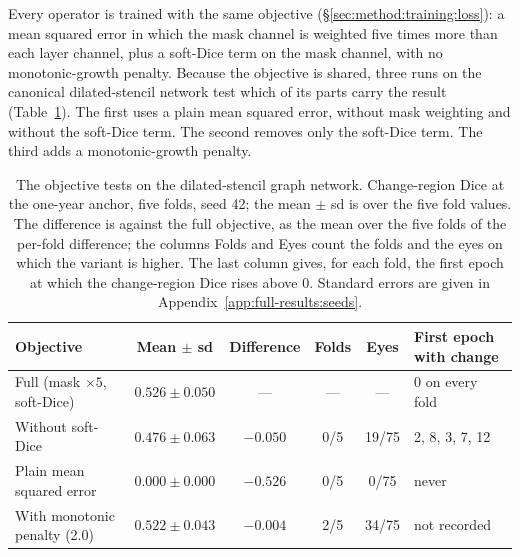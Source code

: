 Every operator is trained with the same objective
(\S\ref{sec:method:training:loss}): a mean squared error in which the mask
channel is weighted five times more than each layer channel, plus a
soft-Dice term on the mask channel, with no monotonic-growth penalty.
Because the objective is shared, three runs on the canonical
dilated-stencil network test which of its parts carry the result
(Table~\ref{tab:experiments:objective}). The first uses a plain mean
squared error, without mask weighting and without the soft-Dice term. The
second removes only the soft-Dice term. The third adds a monotonic-growth
penalty.

\begin{table}[h]
  \centering
  \caption[The objective tests.]{%
    The objective tests on the dilated-stencil graph network.
    Change-region Dice at the one-year anchor, five folds, seed 42; the
    mean $\pm$ sd is over the five fold values. The difference is against
    the full objective, as the mean over the five folds of the per-fold
    difference; the columns Folds and Eyes count the folds and the eyes on
    which the variant is higher. The last column gives, for each fold, the first
    epoch at which the change-region Dice rises above 0. Standard errors
    are given in Appendix~\ref{app:full-results:seeds}.}
  \label{tab:experiments:objective}
  \footnotesize
  \setlength{\tabcolsep}{4pt}
  \begin{tabular}{p{} c c c c p{}}
    \toprule
    Objective & Mean $\pm$ sd & Difference & Folds & Eyes
      & First epoch with change \\
    \midrule
    Full (mask $\times 5$, soft-Dice) & $0.526 \pm 0.050$ & --- & --- & ---
      & 0 on every fold \\
    Without soft-Dice & $0.476 \pm 0.063$ & $-0.050$ & 0/5 & 19/75
      & 2, 8, 3, 7, 12 \\
    Plain mean squared error & $0.000 \pm 0.000$ & $-0.526$ & 0/5 & 0/75
      & never \\
    With monotonic penalty (2.0) & $0.522 \pm 0.043$ & $-0.004$ & 2/5 & 34/75
      & not recorded \\
    \bottomrule
  \end{tabular}
\end{table}

